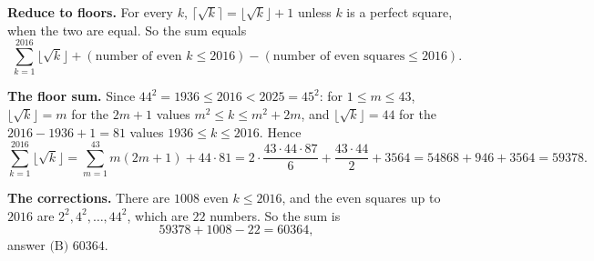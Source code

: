 \textbf{Reduce to floors.} For every $k$, $\lceil\sqrt k\rceil=\lfloor\sqrt k\rfloor+1$ unless $k$ is a perfect square, when the two are equal. So the sum equals
\[
\sum_{k=1}^{2016}\lfloor\sqrt k\rfloor+(\text{number of even }k\le2016)-(\text{number of even squares}\le2016).
\]

\textbf{The floor sum.} Since $44^2=1936\le2016<2025=45^2$: for $1\le m\le43$, $\lfloor\sqrt k\rfloor=m$ for the $2m+1$ values $m^2\le k\le m^2+2m$, and $\lfloor\sqrt k\rfloor=44$ for the $2016-1936+1=81$ values $1936\le k\le2016$. Hence
\[
\sum_{k=1}^{2016}\lfloor\sqrt k\rfloor=\sum_{m=1}^{43}m(2m+1)+44\cdot81
=2\cdot\dfrac{43\cdot44\cdot87}{6}+\dfrac{43\cdot44}{2}+3564=54868+946+3564=59378 .
\]

\textbf{The corrections.} There are $1008$ even $k\le2016$, and the even squares up to $2016$ are $2^2,4^2,\dots,44^2$, which are $22$ numbers. So the sum is
\[
59378+1008-22=60364,
\]
answer $\boxed{\text{(B) }60364}$.
